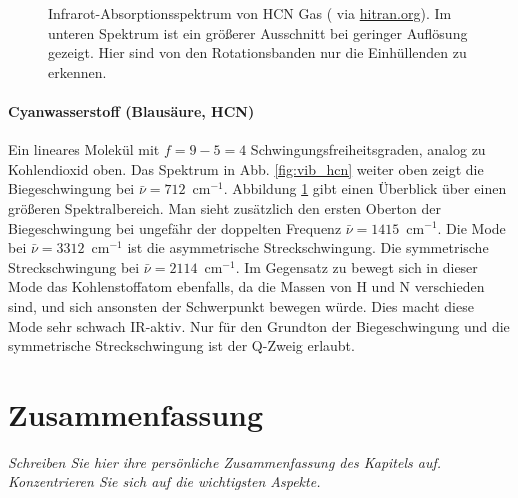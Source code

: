 \begin{figure}
\caption{Infrarot-Absorptionsspektrum von HCN Gas  (\cite{Maki_1995_HCN} via \href{https://hitran.org}{hitran.org}). Im unteren Spektrum ist ein größerer Ausschnitt bei geringer Auflösung gezeigt. Hier sind von den Rotationsbanden nur die Einhüllenden zu erkennen.
\label{fig:vib_hcn_all}}
\end{figure}


\paragraph{Cyanwasserstoff (Blausäure, HCN)}  
\begin{marginfigure}
\end{marginfigure}
Ein lineares Molekül mit $f=9 - 5 = 4$ Schwingungsfreiheitsgraden, analog zu Kohlendioxid oben. Das Spektrum in Abb. \ref{fig:vib_hcn} weiter oben zeigt die Biegeschwingung bei $\bar{\nu} = 712$~cm$^{-1}$.  Abbildung \ref{fig:vib_hcn_all} gibt einen Überblick über einen größeren Spektralbereich. Man sieht zusätzlich den 
ersten Oberton der Biegeschwingung bei ungefähr der doppelten Frequenz  $\bar{\nu} = 1415$~cm$^{-1}$. Die Mode bei  $\bar{\nu} = 3312$~cm$^{-1}$ ist die  asymmetrische Streckschwingung. Die symmetrische Streckschwingung  bei $\bar{\nu} = 2114$~cm$^{-1}$.
 Im Gegensatz zu  bewegt sich in dieser Mode das Kohlenstoffatom ebenfalls, da die Massen von H und N verschieden sind, und sich ansonsten der  Schwerpunkt bewegen würde. Dies macht diese Mode sehr schwach IR-aktiv.  Nur für den Grundton der Biegeschwingung und die  symmetrische Streckschwingung ist der Q-Zweig erlaubt.







\section{Zusammenfassung}

\textit{Schreiben Sie hier ihre persönliche Zusammenfassung des Kapitels auf. Konzentrieren Sie sich auf die wichtigsten Aspekte.}

\vspace*{10cm}


\printbibliography[segment=\therefsegment,heading=subbibliography]
